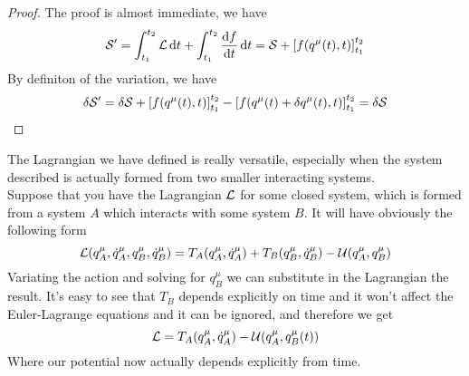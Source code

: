 \documentclass[../admech.tex]{subfiles}
\begin{document}
\begin{proof}
	The proof is almost immediate, we have
	\begin{equation*}
		\mathcal{S}'=\int_{t_1}^{t_2}\mathcal{L}\dd{t}+\int_{t_1}^{t_2}\dv{f}{t}\dd{t}=\mathcal{S}+\left[ f(q^\mu(t),t) \right]^{t_2}_{t_1}
	\end{equation*}
	By definiton of the variation, we have
	\begin{equation*}
		\delta\mathcal{S}'=\delta\mathcal{S}+\left[ f(q^\mu(t),t) \right]_{t_1}^{t_2}-\left[ f(q^\mu(t)+\delta q^\mu(t),t) \right]_{t_1}^{t_2}=\delta\mathcal{S}
	\end{equation*}
\end{proof}
The Lagrangian we have defined is really versatile, especially when the system described is actually formed from two smaller interacting systems.\\
Suppose that you have the Lagrangian $\mathcal{L}$ for some closed system, which is formed from a system $A$ which interacts with some system $B$. It will have obviously the following form
\begin{equation*}
	\mathcal{L}(q^\mu_A,\dot{q}^\mu_A,q^\mu_B,\dot{q}^\mu_B)=T_A(q^\mu_A,\dot{q}^\mu_A)+T_B(q^\mu_B,\dot{q}^\mu_B)-\mathcal{U}(q^\mu_A,q^\mu_B)
\end{equation*}
Variating the action and solving for $q^\mu_B$ we can substitute in the Lagrangian the result. It's easy to see that $T_B$ depends explicitly on time and it won't affect the Euler-Lagrange equations and it can be ignored, and therefore we get
\begin{equation*}
	\mathcal{L}=T_A(q^\mu_A,\dot{q}^\mu_A)-\mathcal{U}(q_A^\mu,q_B^\mu(t))
\end{equation*}
Where our potential now actually depends explicitly from time.
\end{document}
